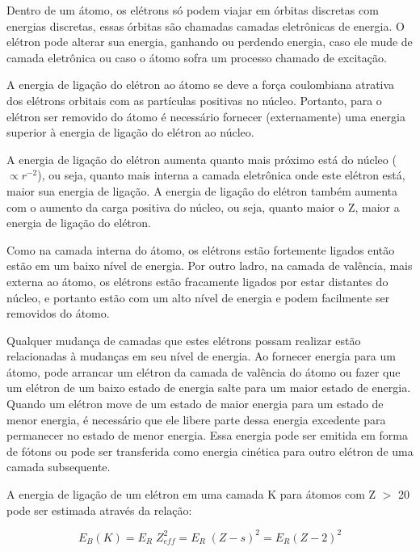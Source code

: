 \documentclass[11pt,a4paper]{article}
\begin{document}
            Dentro de um átomo, os elétrons só podem viajar em órbitas discretas com energias discretas, essas órbitas são chamadas camadas eletrônicas de energia. O elétron pode alterar sua energia, ganhando ou perdendo energia, caso ele mude de camada eletrônica ou caso o átomo sofra um processo chamado de excitação. 

                    
                
                A energia de ligação do elétron ao átomo se deve a força coulombiana atrativa dos elétrons orbitais com as partículas positivas no núcleo. Portanto, para o elétron ser removido do átomo é necessário fornecer (externamente) uma energia superior à energia de ligação do elétron ao núcleo. 

                A energia de ligação do elétron aumenta quanto mais próximo está do núcleo ($\varpropto r^{-2}$), ou seja, quanto mais interna a camada eletrônica onde este elétron está, maior sua energia de ligação. A energia de ligação do elétron também aumenta com o aumento da carga positiva do núcleo, ou seja, quanto maior o Z, maior a energia de ligação do elétron.

                Como na camada interna do átomo, os elétrons estão fortemente ligados então estão em um baixo nível de energia. Por outro ladro, na camada de valência, mais externa ao átomo, os elétrons estão fracamente ligados por estar distantes do núcleo, e portanto estão com um alto nível de energia e podem facilmente ser removidos do átomo.

                Qualquer mudança de camadas que estes elétrons possam realizar estão relacionadas à mudanças em seu nível de energia. Ao fornecer energia para um átomo, pode arrancar um elétron da camada de valência do átomo ou fazer que um elétron de um baixo estado de energia salte para um maior estado de energia. Quando um elétron move de um estado de maior energia para um estado de menor energia, é necessário que ele libere parte dessa energia excedente para permanecer no estado de menor energia. Essa energia pode ser emitida em forma de fótons ou pode ser transferida como energia cinética para outro elétron de uma camada subsequente.

                A energia de ligação de um elétron em uma camada K para átomos com Z $>$ 20 pode ser estimada através da relação:

                    \begin{equation}
                        E_B(K) = E_R \; Z_{eff}^2 = E_R \; (Z - s)^2 = E_R(Z - 2)^2
                    \end{equation}
                
\end{document}
